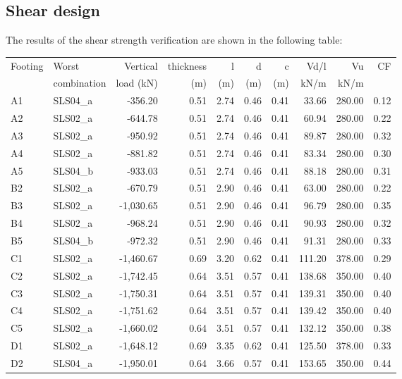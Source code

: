 \subsection{Shear design}
The results of the shear strength verification are shown in the following table:

\begin{center}
  \begin{tabular}{|l|l|r|r|r|r|r|r|r|r|}
\hline
Footing & Worst & Vertical & thickness & l & d & c & Vd/l & Vu & CF\\
 & combination & load (kN) & (m) & (m) & (m) & (m) & kN/m & kN/m & \\
\hline
 A1 &  SLS04\_a & -356.20 & 0.51 & 2.74 & 0.46 & 0.41 & 33.66 & 280.00 & 0.12\\
 A2 &  SLS02\_a & -644.78 & 0.51 & 2.74 & 0.46 & 0.41 & 60.94 & 280.00 & 0.22\\
 A3 &  SLS02\_a & -950.92 & 0.51 & 2.74 & 0.46 & 0.41 & 89.87 & 280.00 & 0.32\\
 A4 &  SLS02\_a & -881.82 & 0.51 & 2.74 & 0.46 & 0.41 & 83.34 & 280.00 & 0.30\\
 A5 &  SLS04\_b & -933.03 & 0.51 & 2.74 & 0.46 & 0.41 & 88.18 & 280.00 & 0.31\\
 B2 &  SLS02\_a & -670.79 & 0.51 & 2.90 & 0.46 & 0.41 & 63.00 & 280.00 & 0.22\\
 B3 &  SLS02\_a & -1,030.65 & 0.51 & 2.90 & 0.46 & 0.41 & 96.79 & 280.00 & 0.35\\
 B4 &  SLS02\_a & -968.24 & 0.51 & 2.90 & 0.46 & 0.41 & 90.93 & 280.00 & 0.32\\
 B5 &  SLS04\_b & -972.32 & 0.51 & 2.90 & 0.46 & 0.41 & 91.31 & 280.00 & 0.33\\
 C1 &  SLS02\_a & -1,460.67 & 0.69 & 3.20 & 0.62 & 0.41 & 111.20 & 378.00 & 0.29\\
 C2 &  SLS02\_a & -1,742.45 & 0.64 & 3.51 & 0.57 & 0.41 & 138.68 & 350.00 & 0.40\\
 C3 &  SLS02\_a & -1,750.31 & 0.64 & 3.51 & 0.57 & 0.41 & 139.31 & 350.00 & 0.40\\
 C4 &  SLS02\_a & -1,751.62 & 0.64 & 3.51 & 0.57 & 0.41 & 139.42 & 350.00 & 0.40\\
 C5 &  SLS02\_a & -1,660.02 & 0.64 & 3.51 & 0.57 & 0.41 & 132.12 & 350.00 & 0.38\\
 D1 &  SLS02\_a & -1,648.12 & 0.69 & 3.35 & 0.62 & 0.41 & 125.50 & 378.00 & 0.33\\
 D2 &  SLS04\_a & -1,950.01 & 0.64 & 3.66 & 0.57 & 0.41 & 153.65 & 350.00 & 0.44\\

\end{tabular}
\end{center}
